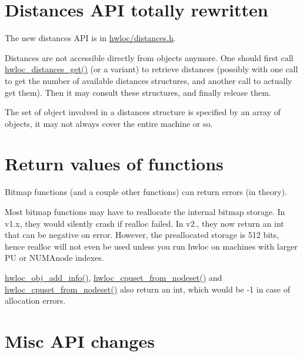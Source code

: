  \hypertarget{a00395_upgrade_to_api_2x_distances}{}\section{Distances A\+P\+I totally rewritten}\label{a00395_upgrade_to_api_2x_distances}
The new distances A\+PI is in \hyperlink{a00131_source}{hwloc/distances.\+h}.

Distances are not accessible directly from objects anymore. One should first call \hyperlink{a00208_ga613e6b2a5d0f06626ee8d0c12fa46691}{hwloc\+\_\+distances\+\_\+get()} (or a variant) to retrieve distances (possibly with one call to get the number of available distances structures, and another call to actually get them). Then it may consult these structures, and finally release them.

The set of object involved in a distances structure is specified by an array of objects, it may not always cover the entire machine or so.

 \hypertarget{a00395_upgrade_to_api_2x_return}{}\section{Return values of functions}\label{a00395_upgrade_to_api_2x_return}
Bitmap functions (and a couple other functions) can return errors (in theory).

Most bitmap functions may have to reallocate the internal bitmap storage. In v1.\+x, they would silently crash if realloc failed. In v2., they now return an int that can be negative on error. However, the preallocated storage is 512 bits, hence realloc will not even be used unless you run hwloc on machines with larger PU or N\+U\+M\+Anode indexes.

\hyperlink{a00189_gace7654bb8a9002caae1a4b8a59e7452e}{hwloc\+\_\+obj\+\_\+add\+\_\+info()}, \hyperlink{a00203_gad5ee8691e08a3538ea7633344c00456d}{hwloc\+\_\+cpuset\+\_\+from\+\_\+nodeset()} and \hyperlink{a00203_gad5ee8691e08a3538ea7633344c00456d}{hwloc\+\_\+cpuset\+\_\+from\+\_\+nodeset()} also return an int, which would be -\/1 in case of allocation errors.

 \hypertarget{a00395_upgrade_to_api_2x_misc}{}\section{Misc A\+P\+I changes}\label{a00395_upgrade_to_api_2x_misc}

